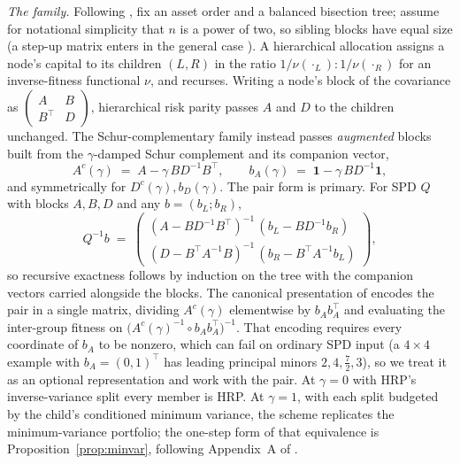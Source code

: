 \documentclass[11pt]{article}
\theoremstyle{remark}
\begin{document}
\emph{The family.} Following \cite{cotton2024schur}, fix an asset order and a
balanced bisection tree; assume for notational simplicity that $n$ is a power
of two, so sibling blocks have equal size (a step-up matrix enters in the
general case \cite{cotton2024schur}). A hierarchical allocation assigns a node's
capital to its children $(L, R)$ in the ratio $1/\nu(\cdot_L) : 1/\nu(\cdot_R)$
for an inverse-fitness functional $\nu$, and recurses. Writing a node's block
of the covariance as
$\left(\begin{smallmatrix} A & B \\ B^\top & D \end{smallmatrix}\right)$,
hierarchical risk parity passes $A$ and $D$ to the children unchanged. The
Schur-complementary family instead passes \emph{augmented} blocks built from
the $\gamma$-damped Schur complement and its companion vector,
\begin{equation}
  A^c(\gamma) \;=\; A - \gamma\, B D^{-1} B^\top,
  \qquad
  b_A(\gamma) \;=\; \mathbf{1} - \gamma\, B D^{-1} \mathbf{1},
  \label{eq:family}
\end{equation}
and symmetrically for $D^c(\gamma), b_D(\gamma)$. The pair form is
primary. For SPD $Q$ with blocks $A, B, D$ and any
$b = (b_L; b_R)$,
\[
  Q^{-1} b \;=\;
  \begin{pmatrix}
    (A - B D^{-1} B^\top)^{-1}\,(b_L - B D^{-1} b_R) \\
    (D - B^\top A^{-1} B)^{-1}\,(b_R - B^\top A^{-1} b_L)
  \end{pmatrix},
\]
so recursive exactness follows by induction on the tree with the
companion vectors carried alongside the blocks. The canonical
presentation of \cite{cotton2024schur} encodes the pair in a single
matrix, dividing $A^c(\gamma)$ elementwise by $b_A b_A^\top$ and
evaluating the inter-group fitness on
$\big(A^c(\gamma)^{-1} \circ b_A b_A^\top\big)^{-1}$. That encoding
requires every coordinate of $b_A$ to be nonzero, which can fail on
ordinary SPD input (a $4 \times 4$ example with $b_A = (0,1)^\top$ has
leading principal minors $2, 4, \tfrac72, 3$), so we treat it as an
optional representation and work with the pair. At $\gamma = 0$ with HRP's
inverse-variance split every member is HRP. At $\gamma = 1$, with each split
budgeted by the child's conditioned minimum variance, the scheme replicates the
minimum-variance portfolio; the one-step form of that equivalence is
Proposition~\ref{prop:minvar}, following Appendix~A of
\cite{cotton2024schur}.
\end{document}
